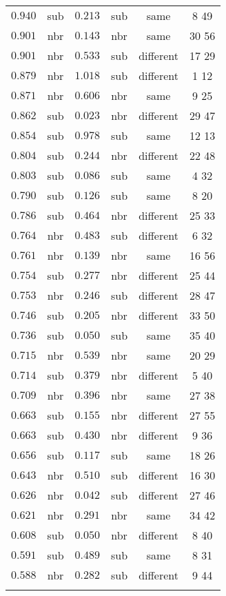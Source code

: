 \begin{table}[!htbp]
\begin{tabular}{@{\extracolsep{5pt}} cccccc}
$0.940$ & sub & $0.213$ & sub & same & 8 49  \\ 
$0.901$ & nbr & $0.143$ & nbr & same & 30 56  \\ 
$0.901$ & nbr & $0.533$ & sub & different & 17 29  \\ 
$0.879$ & nbr & $1.018$ & sub & different & 1 12  \\ 
$0.871$ & nbr & $0.606$ & nbr & same & 9 25  \\ 
$0.862$ & sub & $0.023$ & nbr & different & 29 47  \\ 
$0.854$ & sub & $0.978$ & sub & same & 12 13  \\ 
$0.804$ & sub & $0.244$ & nbr & different & 22 48  \\ 
$0.803$ & sub & $0.086$ & sub & same & 4 32  \\ 
$0.790$ & sub & $0.126$ & sub & same & 8 20  \\ 
$0.786$ & sub & $0.464$ & nbr & different & 25 33  \\ 
$0.764$ & nbr & $0.483$ & sub & different & 6 32  \\ 
$0.761$ & nbr & $0.139$ & nbr & same & 16 56  \\ 
$0.754$ & sub & $0.277$ & nbr & different & 25 44  \\ 
$0.753$ & nbr & $0.246$ & sub & different & 28 47  \\ 
$0.746$ & sub & $0.205$ & nbr & different & 33 50  \\ 
$0.736$ & sub & $0.050$ & sub & same & 35 40  \\ 
$0.715$ & nbr & $0.539$ & nbr & same & 20 29  \\ 
$0.714$ & sub & $0.379$ & nbr & different & 5 40  \\ 
$0.709$ & nbr & $0.396$ & nbr & same & 27 38  \\ 
$0.663$ & sub & $0.155$ & nbr & different & 27 55  \\ 
$0.663$ & sub & $0.430$ & nbr & different & 9 36  \\ 
$0.656$ & sub & $0.117$ & sub & same & 18 26  \\ 
$0.643$ & nbr & $0.510$ & sub & different & 16 30  \\ 
$0.626$ & nbr & $0.042$ & sub & different & 27 46  \\ 
$0.621$ & nbr & $0.291$ & nbr & same & 34 42  \\ 
$0.608$ & sub & $0.050$ & nbr & different & 8 40  \\ 
$0.591$ & sub & $0.489$ & sub & same & 8 31  \\ 
$0.588$ & nbr & $0.282$ & sub & different & 9 44  \\ 
\hline \\[-1.8ex] 
\end{tabular} 
\end{table} 
